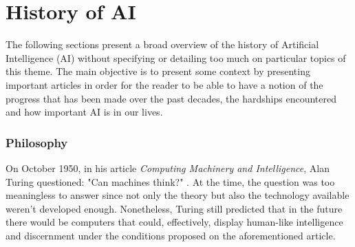 \documentclass[class=report, crop=false, a4paper, 12pt]{standalone}
\begin{document}
\section{History of AI}
The following sections present a broad overview of the history of Artificial Intelligence (AI) without specifying or detailing too much on particular topics of this theme. The main objective is to present some context by presenting important articles in order for the reader to be able to have a notion of the progress that has been made over the past decades, the hardships encountered and how important AI is in our lives. 
\subsubsection{Philosophy}
On October 1950, in his article \textit{Computing Machinery and Intelligence}, Alan Turing questioned: "Can machines think?" \autocite{turingCOMPUTINGMACHINERYINTELLIGENCE1950}. At the time, the question was too meaningless to answer since not only the theory but also the technology available weren't developed enough. Nonetheless, Turing still predicted that in the future there would be computers that could, effectively, display human-like intelligence and discernment under the conditions proposed on the aforementioned article.

\end{document}
